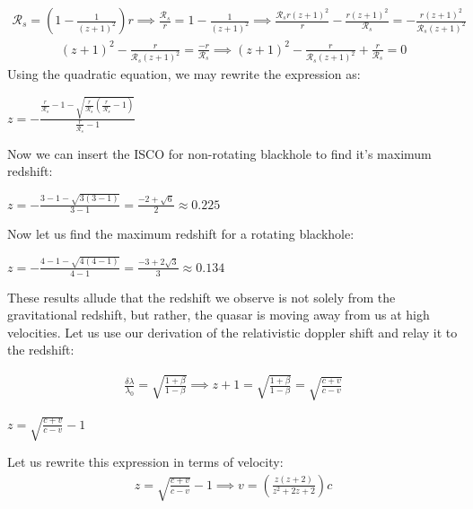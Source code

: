 \documentclass{article}
\begin{document}
\begin{gather*}
	\mathcal{R}_s = \left(1-\frac{1}{(z+1)^2}\right)r \implies \frac{\mathcal{R}_s}{r} = 1 - \frac{1}{(z+1)^2} \implies \frac{\mathcal{R}_sr(z+1)^2}{r} - \frac{r(z+1)^2}{\mathcal{R}_s} = -\frac{r(z+1)^2}{\mathcal{R}_s(z+1)^2}
\end{gather*}
\begin{gather*}
	(z+1)^2 - \frac{r}{\mathcal{R}_s(z+1)^2} = \frac{-r}{\mathcal{R}_s} \implies (z+1)^2 - \frac{r}{\mathcal{R}_s(z+1)^2} + \frac{r}{\mathcal{R}_s} = 0 
\end{gather*}
Using the quadratic equation, we may rewrite the expression as: 

\begin{center}
$\boxed{z = - \frac{\frac{r}{\mathcal{R}_s}-1-\sqrt{\frac{r}{\mathcal{R}_s}(\frac{r}{\mathcal{R}_s}-1)}}{\frac{r}{\mathcal{R}_s}-1}}
$
\end{center}
Now we can insert the ISCO for non-rotating blackhole to find it's maximum redshift: 
\begin{center}
$\boxed{z = - \frac{3-1-\sqrt{3(3-1)}}{3-1} = \frac{-2+\sqrt{6}}{2} \approx 0.225}
$
\end{center}
Now let us find the maximum redshift for a rotating blackhole:
\begin{center}
	$\boxed{z = - \frac{4-1-\sqrt{4(4-1)}}{4-1} = \frac{-3+2\sqrt{3}}{3} \approx 0.134}
	$
\end{center}


These results allude that the redshift we observe is not solely from the gravitational redshift, but rather, the quasar is moving away from us at high velocities. Let us use our derivation of the relativistic doppler shift and relay it to the redshift:

\begin{gather*}
	\frac{\delta\lambda}{\lambda_0} = \sqrt{\frac{1+\beta}{1-\beta}} \implies z + 1 = \sqrt{\frac{1+\beta}{1-\beta}} = \sqrt{\frac{c+v}{c-v}}
\end{gather*}

\begin{center}
	$\boxed{z= \sqrt{\frac{c+v}{c-v}} - 1}
	$
\end{center}

Let us rewrite this expression in terms of velocity: 
\begin{gather*}
z = \sqrt{\frac{c+v}{c-v}} - 1 \implies v = \left(\frac{z(z+2)}{z^2+2z+2}\right)c
\end{gather*}
\end{document}
